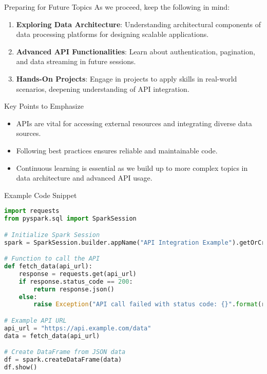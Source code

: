 \documentclass[aspectratio=169]{beamer}
\begin{document}
\begin{frame}[fragile]{Preparing for Future Topics}
    As we proceed, keep the following in mind:

    \begin{enumerate}
        \item \textbf{Exploring Data Architecture}: Understanding architectural components of data processing platforms for designing scalable applications.
        \item \textbf{Advanced API Functionalities}: Learn about authentication, pagination, and data streaming in future sessions.
        \item \textbf{Hands-On Projects}: Engage in projects to apply skills in real-world scenarios, deepening understanding of API integration.
    \end{enumerate}

    \begin{block}{Key Points to Emphasize}
        \begin{itemize}
            \item APIs are vital for accessing external resources and integrating diverse data sources.
            \item Following best practices ensures reliable and maintainable code.
            \item Continuous learning is essential as we build up to more complex topics in data architecture and advanced API usage.
        \end{itemize}
    \end{block}
\end{frame}

\begin{frame}{Example Code Snippet}
    \begin{lstlisting}[language=Python]
import requests
from pyspark.sql import SparkSession

# Initialize Spark Session
spark = SparkSession.builder.appName("API Integration Example").getOrCreate()

# Function to call the API
def fetch_data(api_url):
    response = requests.get(api_url)
    if response.status_code == 200:
        return response.json()
    else:
        raise Exception("API call failed with status code: {}".format(response.status_code))

# Example API URL
api_url = "https://api.example.com/data"
data = fetch_data(api_url)

# Create DataFrame from JSON data
df = spark.createDataFrame(data)
df.show()
    \end{lstlisting}
\end{frame}
\end{document}
